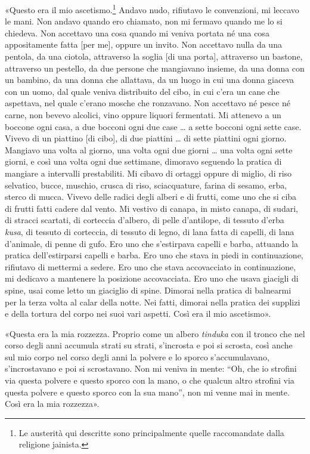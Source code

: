 «Questo era il mio ascetismo.\footnote{Le austerità qui descritte sono
  principalmente quelle raccomandate dalla religione jainista.} Andavo nudo,
rifiutavo le convenzioni, mi leccavo le mani. Non andavo quando ero chiamato,
non mi fermavo quando me lo si chiedeva. Non accettavo una cosa quando mi veniva
portata né una cosa appositamente fatta [per me], oppure un invito. Non
accettavo nulla da una pentola, da una ciotola, attraverso la soglia [di una
porta], attraverso un bastone, attraverso un pestello, da due persone che
mangiavano insieme, da una donna con un bambino, da una donna che allattava, da
un luogo in cui una donna giaceva con un uomo, dal quale veniva distribuito del
cibo, in cui c’era un cane che aspettava, nel quale c’erano mosche che
ronzavano. Non accettavo né pesce né carne, non bevevo alcolici, vino oppure
liquori fermentati. Mi attenevo a un boccone ogni casa, a due bocconi ogni due
case … a sette bocconi ogni sette case. Vivevo di un piattino [di cibo], di due
piattini … di sette piattini ogni giorno. Mangiavo una volta al giorno, una
volta ogni due giorni … una volta ogni sette giorni, e così una volta ogni due
settimane, dimoravo seguendo la pratica di mangiare a intervalli prestabiliti.
Mi cibavo di ortaggi oppure di miglio, di riso selvatico, bucce, muschio, crusca
di riso, sciacquature, farina di sesamo, erba, sterco di mucca. Vivevo delle
radici degli alberi e di frutti, come uno che si ciba di frutti fatti cadere dal
vento. Mi vestivo di canapa, in misto canapa, di sudari, di stracci scartati, di
corteccia d’albero, di pelle d’antilope, di tessuto d’erba \emph{kusa}, di
tessuto di corteccia, di tessuto di legno, di lana fatta di capelli, di lana
d’animale, di penne di gufo. Ero uno che s’estirpava capelli e barba, attuando
la pratica dell’estirparsi capelli e barba. Ero uno che stava in piedi in
continuazione, rifiutavo di mettermi a sedere. Ero uno che stava accovacciato in
continuazione, mi dedicavo a mantenere la posizione accovacciata. Ero uno che
usava giacigli di spine, usai come letto un giaciglio di spine. Dimorai nella
pratica di balnearmi per la terza volta al calar della notte. Nei fatti, dimorai
nella pratica dei supplizi e della tortura del corpo nei suoi vari aspetti. Così
era il mio ascetismo».

«Questa era la mia rozzezza. Proprio come un albero \emph{tinduka} con il tronco
che nel corso degli anni accumula strati su strati, s’incrosta e poi si scrosta,
così anche sul mio corpo nel corso degli anni la polvere e lo sporco
s’accumulavano, s’incrostavano e poi si scrostavano. Non mi veniva in mente:
“Oh, che io strofini via questa polvere e questo sporco con la mano, o che
qualcun altro strofini via questa polvere e questo sporco con la sua mano”, non
mi venne mai in mente. Così era la mia rozzezza».

